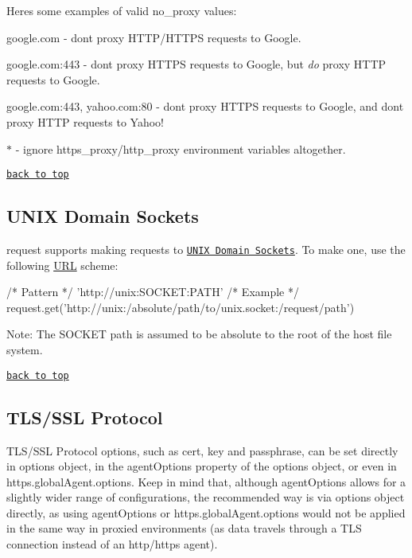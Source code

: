 Here\textquotesingle{}s some examples of valid {\ttfamily no\+\_\+proxy} values\+:


\begin{DoxyItemize}
\item {\ttfamily google.\+com} -\/ don\textquotesingle{}t proxy H\+T\+T\+P/\+H\+T\+T\+PS requests to Google.
\item {\ttfamily google.\+com\+:443} -\/ don\textquotesingle{}t proxy H\+T\+T\+PS requests to Google, but {\itshape do} proxy H\+T\+TP requests to Google.
\item {\ttfamily google.\+com\+:443, yahoo.\+com\+:80} -\/ don\textquotesingle{}t proxy H\+T\+T\+PS requests to Google, and don\textquotesingle{}t proxy H\+T\+TP requests to Yahoo!
\item {\ttfamily $\ast$} -\/ ignore {\ttfamily https\+\_\+proxy}/{\ttfamily http\+\_\+proxy} environment variables altogether.
\end{DoxyItemize}

\href{#table-of-contents}{\tt back to top}





\subsection*{U\+N\+IX Domain Sockets}

{\ttfamily request} supports making requests to \href{https://en.wikipedia.org/wiki/Unix_domain_socket}{\tt U\+N\+IX Domain Sockets}. To make one, use the following \mbox{\hyperlink{namespace_u_r_l}{U\+RL}} scheme\+:


\begin{DoxyCode}
/* Pattern */ 'http://unix:SOCKET:PATH'
/* Example */ request.get('http://unix:/absolute/path/to/unix.socket:/request/path')
\end{DoxyCode}


Note\+: The {\ttfamily S\+O\+C\+K\+ET} path is assumed to be absolute to the root of the host file system.

\href{#table-of-contents}{\tt back to top}





\subsection*{T\+L\+S/\+S\+SL Protocol}

T\+L\+S/\+S\+SL Protocol options, such as {\ttfamily cert}, {\ttfamily key} and {\ttfamily passphrase}, can be set directly in {\ttfamily options} object, in the {\ttfamily agent\+Options} property of the {\ttfamily options} object, or even in {\ttfamily https.\+global\+Agent.\+options}. Keep in mind that, although {\ttfamily agent\+Options} allows for a slightly wider range of configurations, the recommended way is via {\ttfamily options} object directly, as using {\ttfamily agent\+Options} or {\ttfamily https.\+global\+Agent.\+options} would not be applied in the same way in proxied environments (as data travels through a T\+LS connection instead of an http/https agent).


